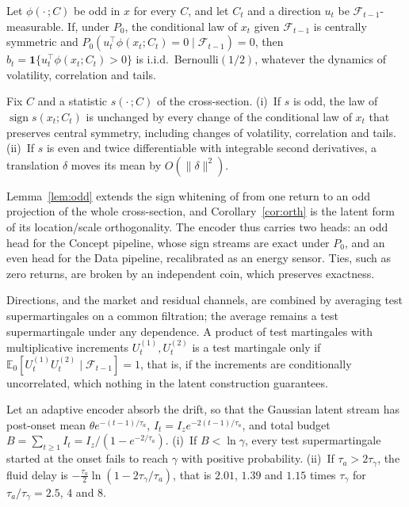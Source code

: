 \begin{lemma}\label{lem:odd}
Let $\phi(\cdot\,;C)$ be odd in $x$ for every $C$, and let $C_t$ and a direction $u_t$ be $\mathcal{F}_{t-1}$-measurable. If, under $P_0$, the conditional law of $x_t$ given $\mathcal{F}_{t-1}$ is centrally symmetric and $P_0(u_t^{\top}\phi(x_t;C_t)=0\mid\mathcal{F}_{t-1})=0$, then $b_t=\mathbf 1\{u_t^{\top}\phi(x_t;C_t)>0\}$ is i.i.d.\ Bernoulli$(1/2)$, whatever the dynamics of volatility, correlation and tails.
\end{lemma}

\begin{corollary}\label{cor:orth}
Fix $C$ and a statistic $s(\cdot\,;C)$ of the cross-section. (i)~If $s$ is odd, the law of $\operatorname{sign}s(x_t;C_t)$ is unchanged by every change of the conditional law of $x_t$ that preserves central symmetry, including changes of volatility, correlation and tails. (ii)~If $s$ is even and twice differentiable with integrable second derivatives, a translation $\delta$ moves its mean by $O(\|\delta\|^2)$.
\end{corollary}

Lemma~\ref{lem:odd} extends the sign whitening of \citet{whitening_2026} from one return to an odd projection of the whole cross-section, and Corollary~\ref{cor:orth} is the latent form of its location/scale orthogonality. The encoder thus carries two heads: an odd head for the Concept pipeline, whose sign streams are exact under $P_0$, and an even head for the Data pipeline, recalibrated as an energy sensor. Ties, such as zero returns, are broken by an independent coin, which preserves exactness.

\begin{remark}\label{rem:mixture}
Directions, and the market and residual channels, are combined by averaging test supermartingales on a common filtration; the average remains a test supermartingale under any dependence. A product of test martingales with multiplicative increments $U^{(1)}_t,U^{(2)}_t$ is a test martingale only if $\mathbb{E}_0[U^{(1)}_tU^{(2)}_t\mid\mathcal{F}_{t-1}]=1$, that is, if the increments are conditionally uncorrelated, which nothing in the latent construction guarantees.
\end{remark}

\begin{proposition}[Absorption]\label{prop:absorption}
Let an adaptive encoder absorb the drift, so that the Gaussian latent stream has post-onset mean $\theta e^{-(t-1)/\tau_a}$, $I_t=I_ze^{-2(t-1)/\tau_a}$, and total budget $B=\sum_{t\ge1}I_t=I_z/(1-e^{-2/\tau_a})$.
(i)~If $B<\ln\gamma$, every test supermartingale started at the onset fails to reach $\gamma$ with positive probability.
(ii)~If $\tau_a>2\tau_\gamma$, the fluid delay is $-\tfrac{\tau_a}{2}\ln(1-2\tau_\gamma/\tau_a)$, that is $2.01$, $1.39$ and $1.15$ times $\tau_\gamma$ for $\tau_a/\tau_\gamma=2.5$, $4$ and $8$.
\end{proposition}

